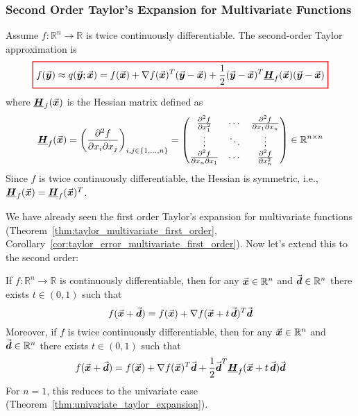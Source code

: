 \subsubsection{Second Order Taylor's Expansion for Multivariate Functions}
\label{subsubsec:second_order_taylor_multivariate}
Assume \(f:\mathbb{R}^{n}\to\mathbb{R}\) is twice continuously differentiable. The second-order Taylor approximation is
\begin{equation}
\label{eq:second_order_taylor_approximation_multivariate}
{\color{Red}
\setlength{\fboxrule}{1pt}
\boxed{ 
\color{black}
f(\vect{y})\approx q(\vect{y};\vect{x})=f(\vect{x})+\nabla f(\vect{x})^{T}(\vect{y}-\vect{x})+\frac{1}{2}(\vect{y}-\vect{x})^{T}\matr{H}_{f}(\vect{x})(\vect{y}-\vect{x}) %
}
}
\end{equation}
where \(\underline{\boldsymbol{H}}_{f}(\vec{\boldsymbol{x}})\) is the Hessian matrix defined as 
\begin{equation}\label{eq:hessian}
\matr{H}_{f}(\vect{x})
=
\left(\frac{\partial^{2}f}{\partial x_{i}\partial x_{j}}\right)_{i,j \in \{1,\ldots,n\}}
=
\begin{pmatrix}
\frac{\partial^{2}f}{\partial x_{1}^{2}} & \cdots & \frac{\partial^{2}f}{\partial x_{1}\partial x_{n}} \\
\vdots & \ddots & \vdots \\
\frac{\partial^{2}f}{\partial x_{n}\partial x_{1}} & \cdots & \frac{\partial^{2}f}{\partial x_{n}^{2}}
\end{pmatrix}
\in \mathbb{R}^{n \times n} %
\end{equation}
Since \(f\) is twice continuously differentiable, the Hessian is symmetric, i.e., \(\underline{\boldsymbol{H}}_{f}(\vec{\boldsymbol{x}})=\underline{\boldsymbol{H}}_{f}(\vec{\boldsymbol{x}})^{T}\).

We have already seen the first order Taylor's expansion for multivariate functions (Theorem~\ref{thm:taylor_multivariate_first_order}, Corollary~\ref{cor:taylor_error_multivariate_first_order}). 
Now let's extend this to the second order:
\begin{theorem}
  \label{thm:multivariate_taylor_expansion_second}
  If \(f:\mathbb{R}^{n}\to\mathbb{R}\) is continuously differentiable, then for any \(\vec{\boldsymbol{x}}\in\mathbb{R}^{n}\) and \(\vec{\boldsymbol{d}}\in\mathbb{R}^{n}\) there exists \(t\in (0,1)\) such that
  \[
  f(\vect{x}+\vect{d})=f(\vect{x})+\nabla f(\vect{x}+t\,\vect{d})^{T}\vect{d} %
  \]
  Moreover, if \(f\) is twice continuously differentiable, then for any \(\vec{\boldsymbol{x}}\in\mathbb{R}^{n}\) and \(\vec{\boldsymbol{d}}\in\mathbb{R}^{n}\) there exists \(t\in (0,1)\) such that
  \[
  f(\vect{x}+\vect{d})=f(\vect{x})+\nabla f(\vect{x})^{T}\vect{d}+\frac{1}{2}\vect{d}^{T}\matr{H}_{f}(\vect{x}+t\,\vect{d})\vect{d} %
  \]
  For \(n = 1\), this reduces to the univariate case (Theorem~\ref{thm:univariate_taylor_expansion}).
\end{theorem}

